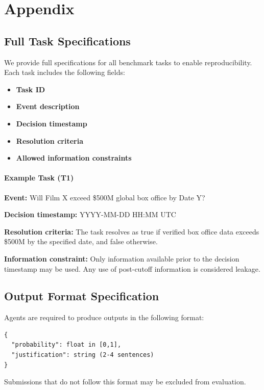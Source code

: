 \documentclass{article} %
\begin{document}
\appendix
\section{Appendix}
\subsection{Full Task Specifications}

We provide full specifications for all benchmark tasks to enable reproducibility. Each task includes the following fields:
\begin{itemize}[noitemsep]
    \item \textbf{Task ID}
    \item \textbf{Event description}
    \item \textbf{Decision timestamp}
    \item \textbf{Resolution criteria}
    \item \textbf{Allowed information constraints}
\end{itemize}

\paragraph{Example Task (T1)}

\textbf{Event:} Will Film X exceed \$500M global box office by Date Y?

\textbf{Decision timestamp:} YYYY-MM-DD HH:MM UTC

\textbf{Resolution criteria:} The task resolves as true if verified box office data exceeds \$500M by the specified date, and false otherwise.

\textbf{Information constraint:} Only information available prior to the decision timestamp may be used. Any use of post-cutoff information is considered leakage.

\subsection{Output Format Specification}

Agents are required to produce outputs in the following format:

\begin{verbatim}
{
  "probability": float in [0,1],
  "justification": string (2-4 sentences)
}
\end{verbatim}

Submissions that do not follow this format may be excluded from evaluation.
\end{document}
